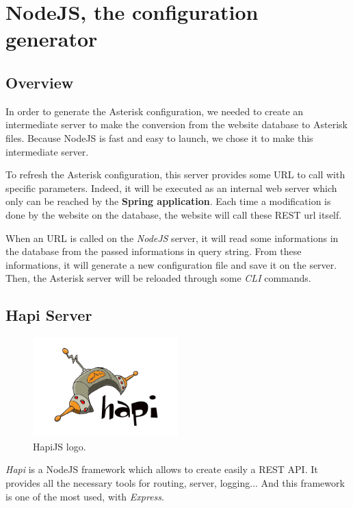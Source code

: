 \chapter{NodeJS, the configuration generator}
\section{Overview}

In order to generate the Asterisk configuration, we needed to create an intermediate server to make the conversion from the website database to Asterisk files. Because NodeJS is fast and easy to launch, we chose it to make this intermediate server. \newline

To refresh the Asterisk configuration, this server provides some URL to call with specific parameters. Indeed, it will be executed as an internal web server which only can be reached by the \textbf{Spring application}. Each time a modification is done by the website on the database, the website will call these REST url itself. \newline

When an URL is called on the \textit{NodeJS} server, it will read some informations in the database from the passed informations in query string. From these informations, it will generate a new configuration file and save it on the server. Then, the Asterisk server will be reloaded through some \textit{CLI} commands.

\section{Hapi Server}

\begin{figure}[H]
  \caption{HapiJS logo.}
  \centering
    \includegraphics[width=0.5\textwidth]{img/hapijs}
\end{figure}

\textit{Hapi} is a NodeJS framework which allows to create easily a REST API. It provides all the necessary tools for routing, server, logging... And this framework is one of the most used, with \textit{Express}.

